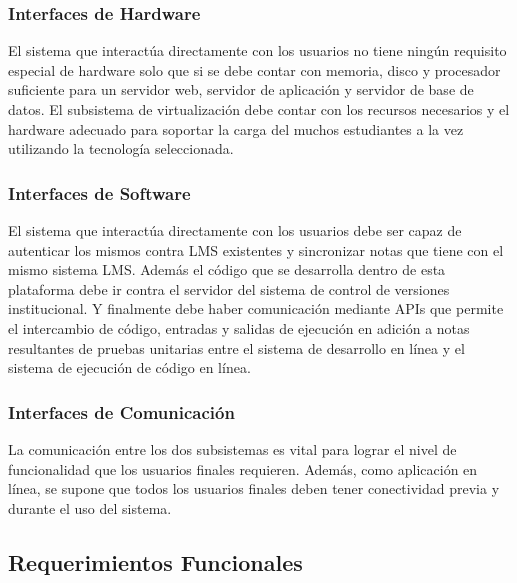 \subsubsection{Interfaces de Hardware}
El sistema que interactúa directamente con los usuarios no tiene ningún requisito especial de hardware solo que si se debe contar con memoria, disco y procesador suficiente para un servidor web, servidor de aplicación y servidor de base de datos. El subsistema de virtualización debe contar con los recursos necesarios y el hardware adecuado para soportar la carga del muchos estudiantes a la vez utilizando la tecnología seleccionada.

\subsubsection{Interfaces de Software}
El sistema que interactúa directamente con los usuarios debe ser capaz de autenticar los mismos contra LMS existentes y sincronizar notas que tiene con el mismo sistema LMS. Además el código que se desarrolla dentro de esta plataforma debe ir contra el servidor del sistema de control de versiones institucional. Y finalmente debe haber comunicación mediante APIs que permite el intercambio de código, entradas y salidas de ejecución en adición a notas resultantes de pruebas unitarias entre el sistema de desarrollo en línea y el sistema de ejecución de código en línea.

\subsubsection{Interfaces de Comunicación}
La comunicación entre los dos subsistemas es vital para lograr el nivel de funcionalidad que los usuarios finales requieren. Además, como aplicación en línea, se supone que todos los usuarios finales deben tener conectividad previa y durante el uso del sistema.

\subsection{Requerimientos Funcionales}


